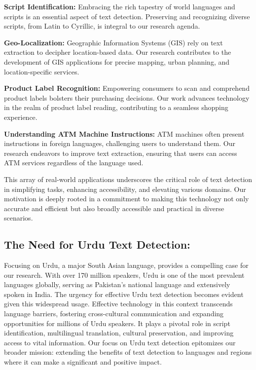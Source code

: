 \textbf{Script Identification:} Embracing the rich tapestry of world languages and scripts is an essential aspect of text detection. Preserving and recognizing diverse scripts, from Latin to Cyrillic, is integral to our research agenda.

\textbf{Geo-Localization:} Geographic Information Systems (GIS) rely on text extraction to decipher location-based data. Our research contributes to the development of GIS applications for precise mapping, urban planning, and location-specific services.

\textbf{Product Label Recognition:} Empowering consumers to scan and comprehend product labels bolsters their purchasing decisions. Our work advances technology in the realm of product label reading, contributing to a seamless shopping experience.

\textbf{Understanding ATM Machine Instructions:} ATM machines often present instructions in foreign languages, challenging users to understand them. Our research endeavors to improve text extraction, ensuring that users can access ATM services regardless of the language used.

This array of real-world applications underscores the critical role of text detection in simplifying tasks, enhancing accessibility, and elevating various domains. Our motivation is deeply rooted in a commitment to making this technology not only accurate and efficient but also broadly accessible and practical in diverse scenarios.

\subsection{The Need for Urdu Text Detection:}
Focusing on Urdu, a major South Asian language, provides a compelling case for our research. With over 170 million speakers, Urdu is one of the most prevalent languages globally, serving as Pakistan's national language and extensively spoken in India. The urgency for effective Urdu text detection becomes evident given this widespread usage. Effective technology in this context transcends language barriers, fostering cross-cultural communication and expanding opportunities for millions of Urdu speakers. It plays a pivotal role in script identification, multilingual translation, cultural preservation, and improving access to vital information. Our focus on Urdu text detection epitomizes our broader mission: extending the benefits of text detection to languages and regions where it can make a significant and positive impact.

